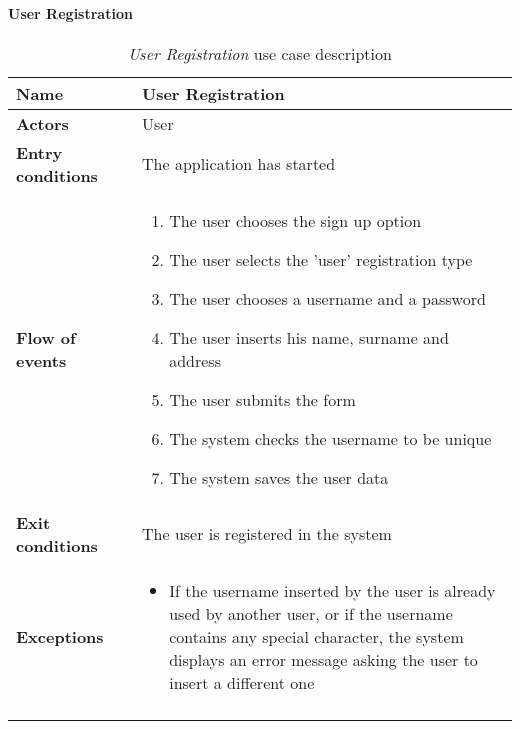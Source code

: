 		\paragraph{User Registration}
		\begin{longtable}{p{0.25\linewidth}p{0.75\linewidth}}
			\toprule
			\textbf{Name} & \textbf{User Registration} \\
			\midrule
			\textbf{Actors} & User \\
			\midrule
			\textbf{Entry conditions} & The application has started \\
			\midrule
			\textbf{Flow of events} & 
			\begin{enumerate}
				\item The user chooses the sign up option
				\item The user selects the 'user' registration type
				\item The user chooses a username and a password
				\item The user inserts his name, surname and address
				\item The user submits the form
				\item The system checks the username to be unique
				\item The system saves the user data
			\end{enumerate} \\
			\midrule
			\textbf{Exit conditions} & The user is registered in the system\\
			\midrule
			\textbf{Exceptions} & 
			\begin{itemize}
				\item If the username inserted by the user is already used by another user, or if the username contains any special character, the system displays an error message asking the user to insert a different one
			\end{itemize} \\
			\bottomrule
			\caption{\emph{User Registration} use case description}
		\end{longtable}
	
